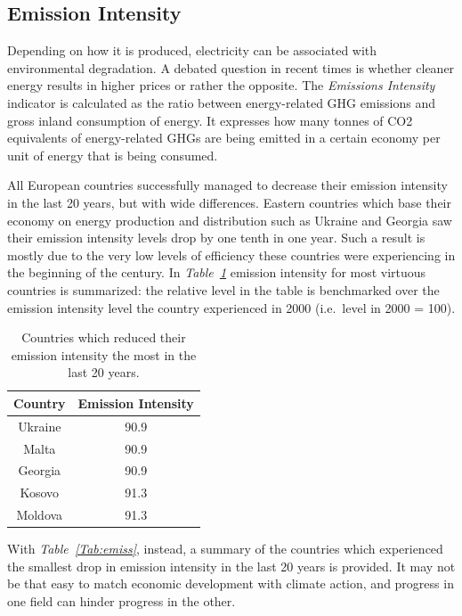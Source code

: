 \documentclass[a4paper,12pt]{book}
\begin{document}
\subsection*{Emission Intensity}

Depending on how it is produced, electricity can be associated with environmental degradation. A debated question in recent times is whether cleaner energy results in higher prices or rather the opposite. The \textit{Emissions Intensity} indicator is calculated as the ratio between energy-related GHG emissions and gross inland consumption of energy. It expresses how many tonnes of CO2 equivalents of energy-related GHGs are being emitted in a certain economy per unit of energy that is being consumed.

All European countries successfully managed to decrease their emission intensity in the last 20 years, but with wide differences. Eastern countries which base their economy on energy production and distribution such as Ukraine and Georgia saw their emission intensity levels drop by one tenth in one year. Such a result is mostly due to the very low levels of efficiency these countries were experiencing in the beginning of the century. In \textit{Table~\ref{Tab:ems}} emission intensity for most virtuous countries is summarized: the relative level in the table is benchmarked over the emission intensity level the country experienced in 2000 (i.e.\ level in 2000 = 100).

\begin{table}[tb]
\begin{center}
\begin{tabular}{|c|c|}
\hline
Country & Emission Intensity \\
\hline
Ukraine & 90.9\\
Malta & 90.9\\
Georgia & 90.9\\
Kosovo & 91.3\\
Moldova & 91.3\\
\hline
\end{tabular}
\caption{Countries which reduced their emission intensity the most in the last 20 years.}
\label{Tab:ems}
\end{center}
\end{table}

With \textit{Table~\ref{Tab:emiss}}, instead, a summary of the countries which experienced the smallest drop in emission intensity in the last 20 years is provided. It may not be that easy to match economic development with climate action, and progress in one field can hinder progress in the other.
\end{document}
